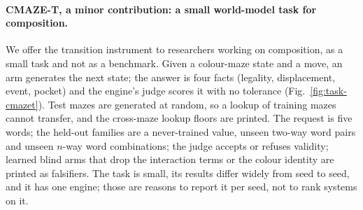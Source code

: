 \documentclass{article} %
\begin{document}
\paragraph{CMAZE-T, a minor contribution: a small world-model task for composition.} We offer the
transition instrument to researchers working on composition, as a small task and not as a benchmark.
Given a colour-maze state and a move, an arm generates the next state; the answer is four facts
(legality, displacement, event, pocket) and the engine's judge scores it with no tolerance
(Fig.~\ref{fig:task-cmazet}). Test mazes are generated at random, so a lookup of training mazes
cannot transfer, and the cross-maze lookup floors are printed. The request is five words; the
held-out families are a never-trained value, unseen two-way word pairs and unseen $n$-way word
combinations; the judge accepts or refuses validity; learned blind arms that drop the interaction
terms or the colour identity are printed as falsifiers. The task is small, its results differ widely from seed to seed, and it has one engine; those are
reasons to report it per seed, not to rank systems on it.

\end{document}

